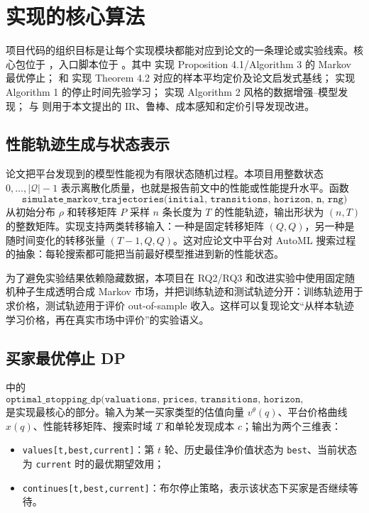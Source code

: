 \documentclass[11pt,a4paper]{ctexart}
\theoremstyle{definition}
\begin{document}
\section{实现的核心算法}

项目代码的组织目标是让每个实现模块都能对应到论文的一条理论或实验线索。核心包位于 ，入口脚本位于 。其中  实现 Proposition 4.1/Algorithm 3 的 Markov 最优停止； 和  实现 Theorem 4.2 对应的样本平均定价及论文启发式基线； 实现 Algorithm 1 的停止时间先验学习； 实现 Algorithm 2 风格的数据增强--模型发现； 与  则用于本文提出的 IR、鲁棒、成本感知和定价引导发现改进。

\subsection{性能轨迹生成与状态表示}

论文把平台发现到的模型性能视为有限状态随机过程。本项目用整数状态 $0,\ldots,|\mathcal Q|-1$ 表示离散化质量，也就是报告前文中的性能或性能提升水平。函数
\[
\texttt{simulate\_markov\_trajectories(initial, transitions, horizon, n, rng)}
\]
从初始分布 $\rho$ 和转移矩阵 $P$ 采样 $n$ 条长度为 $T$ 的性能轨迹，输出形状为 $(n,T)$ 的整数矩阵。实现支持两类转移输入：一种是固定转移矩阵 $(Q,Q)$，另一种是随时间变化的转移张量 $(T-1,Q,Q)$。这对应论文中平台对 AutoML 搜索过程的抽象：每轮搜索都可能把当前最好模型推进到新的性能状态。

为了避免实验结果依赖隐藏数据，本项目在 RQ2/RQ3 和改进实验中使用固定随机种子生成透明合成 Markov 市场，并把训练轨迹和测试轨迹分开：训练轨迹用于求价格，测试轨迹用于评价 out-of-sample 收入。这样可以复现论文“从样本轨迹学习价格，再在真实市场中评价”的实验语义。

\subsection{买家最优停止 DP}

 中的
\[
\texttt{optimal\_stopping\_dp(valuations, prices, transitions, horizon, discovery\_cost)}
\]
是实现最核心的部分。输入为某一买家类型的估值向量 $v^\theta(q)$、平台价格曲线 $x(q)$、性能转移矩阵、搜索时域 $T$ 和单轮发现成本 $c$；输出为两个三维表：
\begin{itemize}
\item \texttt{values[t,best,current]}：第 $t$ 轮、历史最佳净价值状态为 \texttt{best}、当前状态为 \texttt{current} 时的最优期望效用；
\item \texttt{continues[t,best,current]}：布尔停止策略，表示该状态下买家是否继续等待。
\end{itemize}
\end{document}
